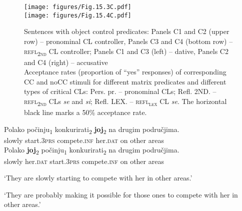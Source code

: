 \begin{figure}
\caption{Sentences with object control predicates: Panels C1 and C2 (upper row) – pronominal CL controller, Panels C3 and C4 (bottom row) – \textsc{refl\textsubscript{2nd}} CL controller; Panels C1 and C3 (left) – dative, Panels C2 and C4 (right) – accusative \\ Acceptance rates (proportion of “yes” responses) of corresponding CC and noCC stimuli for different matrix predicates and different types of critical CLs: Pers. pr. – pronominal CLs; Refl. 2ND. – \textsc{refl\textsubscript{2nd}} CLs \textit{se} and \textit{si}; Refl. LEX. – \textsc{refl\textsubscript{\textsc{lex}}} CL \textit{se}. The horizontal black line marks a 50\% acceptance rate.}\label{F16.1}

\texttt{[image: figures/Fig.15.3C.pdf]} \\\medskip
\texttt{[image: figures/Fig.15.4C.pdf]}
\end{figure}

\newpage

\begin{exe}\ex\begin{xlist}
\ex\label{(16.11a)}
\gll Polako počinju\textsubscript{1} konkurirati\textsubscript{2} \textbf{joj}\textsubscript{2} na drugim područjima. \\
 slowly start.3\textsc{prs} compete.\textsc{inf} her.\textsc{dat} on other areas \\
\ex\label{(16.11b)}
\gll Polako \textbf{joj}\textsubscript{2} počinju\textsubscript{1} konkurirati\textsubscript{2} na drugim područjima. \\
slowly her.\textsc{dat} start.3\textsc{prs} compete.\textsc{inf} on other areas \\
\end{xlist}
\glt ‘They are slowly starting to compete with her in other areas.’ 

\ex
\begin{xlist}
\end{xlist}
\glt‘They are probably making it possible for those ones to compete with her in other areas.’
\end{exe}

